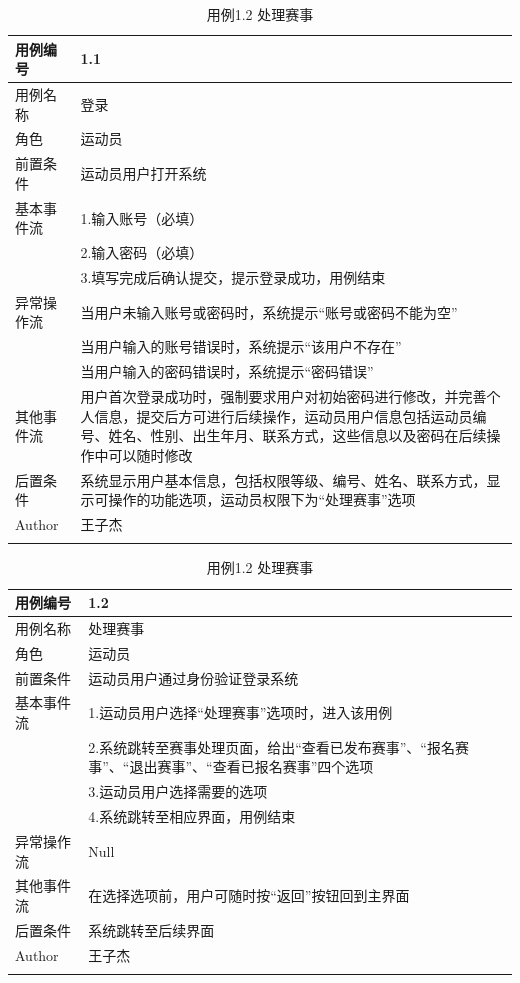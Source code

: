 \documentclass[a4paper,UTF8]{article}
\begin{document}
\begin{table}[H]
	\begin{center}
		\caption{用例1.1 登录}
		\label{table:Tab_uc11}
		\begin{tabular}{|p{}|p{}|}
			\hline\noalign{\smallskip}
			用例编号 & 1.1\\
			\hline
			用例名称 &  登录\\
			\hline
			角色 & 运动员\\
			\hline
			前置条件 & 运动员用户打开系统\\
			\hline
			基本事件流 & 1.输入账号（必填）\\& 2.输入密码（必填） \\& 3.填写完成后确认提交，提示登录成功，用例结束\\
			\hline
			异常操作流 & 当用户未输入账号或密码时，系统提示“账号或密码不能为空” \\& 当用户输入的账号错误时，系统提示“该用户不存在” \\& 当用户输入的密码错误时，系统提示“密码错误”\\
			\hline
			其他事件流 & 用户首次登录成功时，强制要求用户对初始密码进行修改，并完善个人信息，提交后方可进行后续操作，运动员用户信息包括运动员编号、姓名、性别、出生年月、联系方式，这些信息以及密码在后续操作中可以随时修改\\
			\hline
			后置条件 & 系统显示用户基本信息，包括权限等级、编号、姓名、联系方式，显示可操作的功能选项，运动员权限下为“处理赛事”选项\\
			\hline
			Author & 王子杰 \\
			\noalign{\smallskip}
			\hline
			\noalign{\smallskip}
		\end{tabular}
		\caption{用例1.2 处理赛事}
		\label{table:Tab_uc12}
		\begin{tabular}{|p{}|p{}|}
			\hline\noalign{\smallskip}
			用例编号 & 1.2\\
			\hline
			用例名称 &  处理赛事\\
			\hline
			角色 & 运动员\\
			\hline
			前置条件 & 运动员用户通过身份验证登录系统 \\
			\hline
			基本事件流 & 1.运动员用户选择“处理赛事”选项时，进入该用例 \\& 2.系统跳转至赛事处理页面，给出“查看已发布赛事”、“报名赛事”、“退出赛事”、“查看已报名赛事”四个选项 \\& 3.运动员用户选择需要的选项 \\& 4.系统跳转至相应界面，用例结束\\
			\hline
			异常操作流 & Null \\
			\hline
			其他事件流 & 在选择选项前，用户可随时按“返回”按钮回到主界面 \\
			\hline
			后置条件 & 系统跳转至后续界面 \\
			\hline
			Author & 王子杰 \\
			\noalign{\smallskip}
			\hline
			\noalign{\smallskip}
		\end{tabular}
	\end{center}
\end{table}
\end{document}
